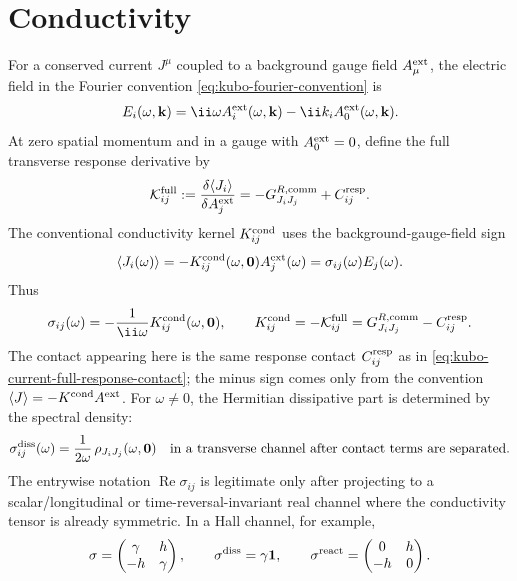 \section{Conductivity}

For a conserved current \(J^\mu\) coupled to a background gauge field
\(A_\mu^{\rm ext}\), the electric field in the Fourier convention
\eqref{eq:kubo-fourier-convention} is
\[
  E_i(\omega,\mathbf k)=\ii\omega A_i^{\rm ext}(\omega,\mathbf k)
  -\ii k_i A_0^{\rm ext}(\omega,\mathbf k).
\]
At zero spatial momentum and in a gauge with \(A_0^{\rm ext}=0\), define the
full transverse response derivative by
\begin{equation}
  \mathcal K^{\rm full}_{ij}
  :=
  \frac{\delta\langle J_i\rangle}{\delta A_j^{\rm ext}}
  =
  -G^{R,\rm comm}_{J_iJ_j}+C^{\rm resp}_{ij}.
  \label{eq:kubo-current-full-response-contact}
\end{equation}
The conventional conductivity kernel \(K^{\rm cond}_{ij}\) uses the
background-gauge-field sign
\[
  \langle J_i(\omega)\rangle
  =
  -K^{\rm cond}_{ij}(\omega,\mathbf0)A_j^{\rm ext}(\omega)
  =
  \sigma_{ij}(\omega)E_j(\omega).
\]
Thus
\begin{equation}
  \sigma_{ij}(\omega)
  =
  -\frac{1}{\ii\omega}K^{\rm cond}_{ij}(\omega,\mathbf0),
  \qquad
  K^{\rm cond}_{ij}
  =
  -\mathcal K^{\rm full}_{ij}
  =
  G^{R,\rm comm}_{J_iJ_j}-C^{\rm resp}_{ij}.
  \label{eq:kubo-conductivity-kernel-contact-sign}
\end{equation}
The contact appearing here is the same response contact
\(C^{\rm resp}_{ij}\) as in
\eqref{eq:kubo-current-full-response-contact}; the minus sign comes only from
the convention \(\langle J\rangle=-K^{\rm cond}A^{\rm ext}\).
For \(\omega\ne0\), the Hermitian dissipative part is determined by the
spectral density:
\begin{equation}
  \sigma^{\rm diss}_{ij}(\omega)
  =
  \frac{1}{2\omega}\,
  \rho_{J_iJ_j}(\omega,\mathbf0)
  \quad
  \text{in a transverse channel after contact terms are separated.}
  \label{eq:kubo-conductivity-spectral-slope}
\end{equation}
The entrywise notation \(\operatorname{Re}\sigma_{ij}\) is legitimate only
after projecting to a scalar/longitudinal or time-reversal-invariant real
channel where the conductivity tensor is already symmetric.  In a Hall
channel, for example,
\[
  \sigma
  =
  \begin{pmatrix}
    \gamma & h\\
    -h & \gamma
  \end{pmatrix},
  \qquad
  \sigma^{\rm diss}
  =
  \gamma\mathbf1,\qquad
  \sigma^{\rm react}
  =
  \begin{pmatrix}
    0 & h\\
    -h & 0
  \end{pmatrix}.
\]
